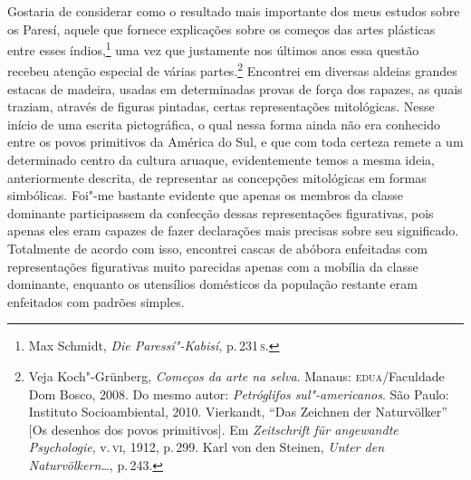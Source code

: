 Gostaria de considerar como o resultado mais importante dos meus
estudos sobre os Paresí, aquele que fornece explicações sobre os
começos das artes plásticas entre esses índios,\footnote{Max Schmidt,
  \textit{Die Paressí"-Kabisí}, p.\,231\,\textsc{s}.} uma vez que justamente nos últimos
anos essa questão recebeu atenção especial de várias partes.\footnote{Veja
  Koch"-Grünberg, \textit{Começos da arte na selva}. Manaus:
  \textsc{edua}/Faculdade Dom Bosco, 2008. Do mesmo autor:
  \textit{Petróglifos sul"-americanos}. São Paulo: Instituto
  Socioambiental, 2010. Vierkandt, ``Das Zeichnen der Naturvölker'' {[}Os desenhos dos povos primitivos{]}. Em \textit{Zeitschrift für angewandte Psychologie}, v.\,\textsc{vi}, 1912, p.\,299. Karl von den
  Steinen, \textit{Unter den Naturvölkern\ldots}, p.\,243.} Encontrei em
diversas aldeias grandes estacas de madeira, usadas em determinadas
provas de força dos rapazes, as quais traziam, através de figuras
pintadas, certas representações mitológicas. Nesse início de uma escrita
pictográfica, o qual nessa forma ainda não era conhecido entre os povos
primitivos da América do Sul, e que com toda certeza remete a um
determinado centro da cultura aruaque, evidentemente temos a mesma
ideia, anteriormente descrita, de representar as concepções mitológicas
em formas simbólicas. Foi"-me bastante evidente que apenas os membros da
classe dominante participassem da confecção dessas representações
figurativas, pois apenas eles eram capazes de fazer declarações mais
precisas sobre seu significado. Totalmente de acordo com isso, encontrei
cascas de abóbora enfeitadas com representações figurativas muito
parecidas apenas com a mobília da classe dominante, enquanto os
utensílios domésticos da população restante eram enfeitados com padrões
simples.

